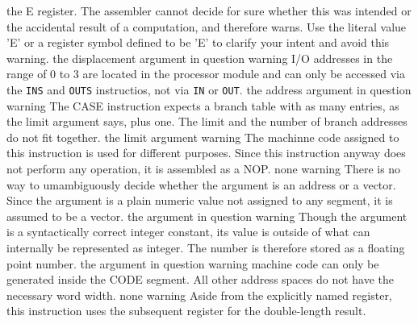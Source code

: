 \documentclass[12pt,twoside]{report}
\begin{document}
\begin{description}
{                the E register.  The assembler cannot decide for sure whether
                this was intended or the accidental result of a computation,
                and therefore warns.  Use the literal value 'E' or a register
                symbol defined to be 'E' to clarify your intent and avoid
                this warning.}
               {the displacement argument in question}
               {warning}
               {I/O addresses in the range of 0 to 3 are located in the
                processor module and can only be accessed via the {\tt INS}
                and {\tt OUTS} instructios, not via {\tt IN} or {\tt OUT}.}
               {the address argument in question}
               {warning}
               {The CASE instruction expects a branch table with as many
                entries, as the limit argument says, plus one.  The limit and
                the number of branch addresses do not fit together.}
               {the limit argument}
               {warning}
               {The machinne code assigned to this instruction is used
                for different purposes.  Since this instruction anyway does
                not perform any operation, it is assembled as a NOP.}
               {none}
               {warning}
               {There is no way to umambiguously decide whether the argument is
                an address or a vector.  Since the argument is a plain numeric
                value not assigned to any segment, it is assumed to be a vector.}
               {the argument in question}
               {warning}
               {Though the argument is a syntactically correct integer constant,
                its value is outside of what can internally be represented as
                integer.  The number is therefore stored as a floating point
                number.}
               {the argument in question}
               {warning}
               {machine code can only be generated inside the CODE segment. All
                other address spaces do not have the necessary word width.}
               {none}
               {warning}
               {Aside from the explicitly named register, this instruction
                uses the subsequent register for the double-length result.
}
\end{description}
\end{document}
